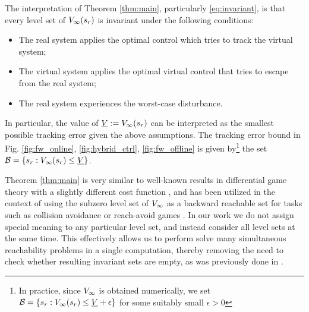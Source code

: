 \begin{rem}
  The interpretation of Theorem \ref{thm:main}, particularly \eqref{eq:invariant}, is that every level set of $V_\infty(s_r)$ is invariant under the following conditions:
  \begin{itemize}
    \item The real system applies the optimal control which tries to track the virtual system;
    \item The virtual system applies the optimal virtual control that tries to escape from the real system;
    \item The real system experiences the worst-case disturbance.
  \end{itemize}
  
  In particular, the value of $\underline{V} := V_\infty(s_r)$ can be interpreted as the smallest possible tracking error  given the above assumptions. The tracking error bound in Fig. \ref{fig:fw_online}, \ref{fig:hybrid_ctrl}, \ref{fig:fw_offline} is given by\footnote{In practice, since $V_\infty$ is obtained numerically, we set $\mathcal B = \{s_r: V_\infty(s_r) \le \underline{V} + \epsilon\}$ for some suitably small $\epsilon>0$} the set $\mathcal B = \{s_r: V_\infty(s_r) \le \underline{V}\}$.
  
\end{rem}
 
 
 \begin{rem} 
   Theorem \ref{thm:main} is very similar to well-known results in differential game theory with a slightly different cost function \cite{}, and has been utilized in the context of using the subzero level set of $V_\infty$ as a backward reachable set for tasks such as collision avoidance or reach-avoid games \cite{}. In our work we do not assign special meaning to any particular level set, and instead consider all level sets at the same time. This effectively allows us to perform solve many simultaneous reachability problems in a single computation, thereby removing the need to check whether resulting invariant sets are empty, as was previously done in .
 \end{rem}

